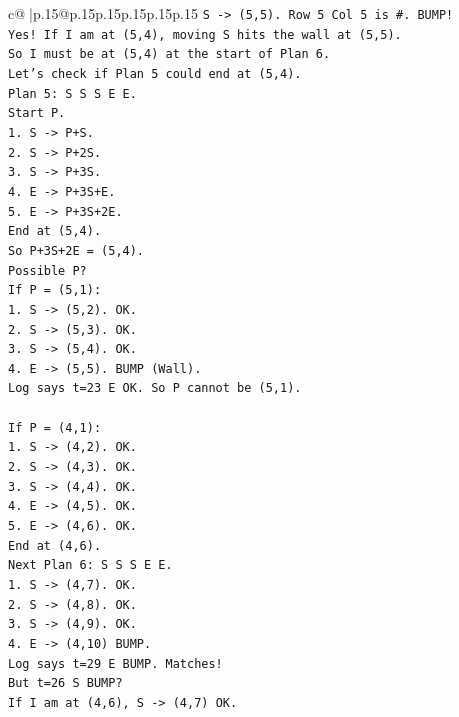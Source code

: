 \documentclass{article}
\begin{document}
{\begin{supertabular}{c@{$\;$}|p{.15\linewidth}@{}p{.15\linewidth}p{.15\linewidth}p{.15\linewidth}p{.15\linewidth}p{.15\linewidth}}
{{{\texttt{S {-}> (5,5). Row 5 Col 5 is \#. BUMP!} \\
\texttt{Yes! If I am at (5,4), moving S hits the wall at (5,5).} \\
\texttt{So I must be at (5,4) at the start of Plan 6.} \\
\texttt{Let's check if Plan 5 could end at (5,4).} \\
\texttt{Plan 5: S S S E E.} \\
\texttt{Start P.} \\
\texttt{1. S {-}> P+S.} \\
\texttt{2. S {-}> P+2S.} \\
\texttt{3. S {-}> P+3S.} \\
\texttt{4. E {-}> P+3S+E.} \\
\texttt{5. E {-}> P+3S+2E.} \\
\texttt{End at (5,4).} \\
\texttt{So P+3S+2E = (5,4).} \\
\texttt{Possible P?} \\
\texttt{If P = (5,1):} \\
\texttt{1. S {-}> (5,2). OK.} \\
\texttt{2. S {-}> (5,3). OK.} \\
\texttt{3. S {-}> (5,4). OK.} \\
\texttt{4. E {-}> (5,5). BUMP (Wall).} \\
\texttt{Log says t=23 E OK. So P cannot be (5,1).} \\
\\ 
\texttt{If P = (4,1):} \\
\texttt{1. S {-}> (4,2). OK.} \\
\texttt{2. S {-}> (4,3). OK.} \\
\texttt{3. S {-}> (4,4). OK.} \\
\texttt{4. E {-}> (4,5). OK.} \\
\texttt{5. E {-}> (4,6). OK.} \\
\texttt{End at (4,6).} \\
\texttt{Next Plan 6: S S S E E.} \\
\texttt{1. S {-}> (4,7). OK.} \\
\texttt{2. S {-}> (4,8). OK.} \\
\texttt{3. S {-}> (4,9). OK.} \\
\texttt{4. E {-}> (4,10) BUMP.} \\
\texttt{Log says t=29 E BUMP. Matches!} \\
\texttt{But t=26 S BUMP?} \\
\texttt{If I am at (4,6), S {-}> (4,7) OK.} \\
}}}
\end{supertabular}}
\end{document}
